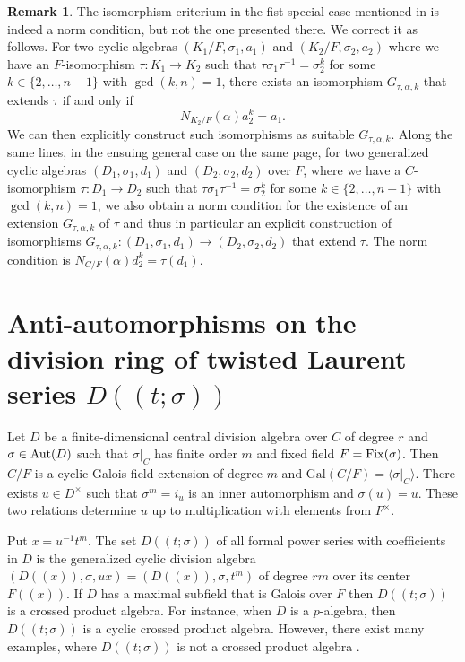\documentclass{amsart}
\theoremstyle{plain}
\theoremstyle{definition}
\newtheorem{remark}[theorem]{Remark}
\numberwithin{equation}{section}
\numberwithin{figure}{section}
\begin{document}
\begin{remark}\label{re:Timo}
The isomorphism criterium in the fist special case mentioned in \cite[Section 3]{TH2007} is indeed a norm condition, but not the one presented there. We correct it as follows. For two cyclic algebras $(K_1/F,\sigma_1,a_1)$ and $(K_2/F,\sigma_2,a_2)$ where we have an $F$-isomorphism $\tau:K_1\to K_2$ such that $\tau \sigma_1\tau^{-1}=\sigma_2^k$ for some $k\in \{2,\dots, n-1 \}$ with $\gcd (k, n)=1$, there exists an isomorphism $G_{\tau,\alpha,k}$ that extends $\tau$ if and only if
$$
N_{K_2/F}(\alpha)a_2^k=a_1.
$$
We can then explicitly construct such isomorphisms as suitable $G_{\tau,\alpha,k}$. Along the same lines, in the ensuing general case on the same page, for two generalized cyclic algebras $(D_1,\sigma_1,d_1)$ and $(D_2,\sigma_2,d_2)$ over $F$, where we have a $C$-isomorphism $\tau:D_1\to D_2$ such that $\tau \sigma_1\tau^{-1}=\sigma_2^k$ for some $k\in \{2,\dots, n-1 \}$ with $\gcd (k, n)=1$, we also obtain a norm condition for the existence of an extension   $G_{\tau,\alpha,k}$  of $\tau $ and thus in particular an explicit construction of  isomorphisms $G_{\tau,\alpha,k}:(D_1,\sigma_1,d_1)\to (D_2,\sigma_2,d_2)$ that extend $\tau$. The norm condition is $ N_{C/F}(\alpha)d_2^{k}=\tau(d_1)$.
\end{remark}



 \section{Anti-automorphisms on the division ring of twisted Laurent series $D((t;\sigma))$}

 Let $D$ be a finite-dimensional central division algebra over $C$ of degree $r$ and
$\sigma\in {\rm Aut}(D)$ such that $\sigma|_{C}$ has finite order $m$  and fixed field $F={\rm Fix}(\sigma)$.
Then  $C/F$ is  a cyclic Galois field extension of
 degree $m$ and $\mathrm{Gal}(C/F) = \langle \sigma |_{C} \rangle$. There exists $u \in D^\times$ such that $\sigma^m = i_u$ is an inner automorphism and $\sigma(u) = u$. These two relations determine $u$ up to multiplication with elements from $F^\times$.


 Put $x=u^{-1}t^m$. The set $D((t;\sigma))$ of all formal power series with coefficients in $D$ is the generalized cyclic division algebra $(D((x)),\sigma, ux)=(D((x)),\sigma, t^m)$ of degree $rm$ over its center $F((x)) $. If $D$ has a maximal subfield that is Galois over $F$ then $D((t;\sigma))$ is a crossed product algebra. For instance, when $D$ is a $p$-algebra, then $D((t;\sigma))$ is a cyclic crossed product algebra. However, there exist many examples, where $D((t;\sigma))$ is not a crossed product algebra \cite{TH}.
\end{document}
